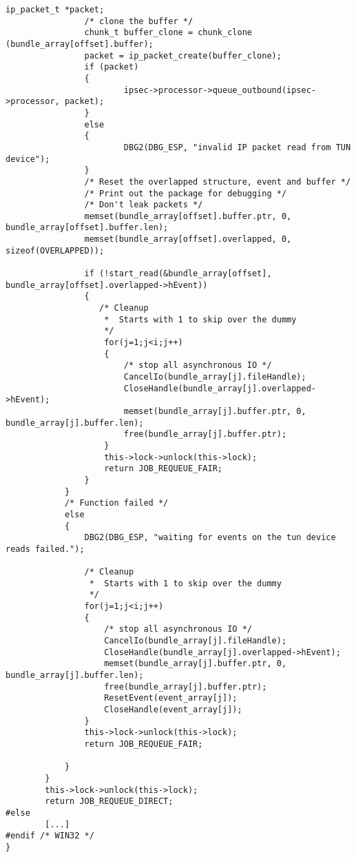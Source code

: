 \begin{lstlisting}[caption=Code für handle\_plain auf Windows,label=lst:handle-plain-windows]
                ip_packet_t *packet;
                /* clone the buffer */
                chunk_t buffer_clone = chunk_clone (bundle_array[offset].buffer);
                packet = ip_packet_create(buffer_clone);
                if (packet)
                {
                        ipsec->processor->queue_outbound(ipsec->processor, packet);
                }
                else
                {
                        DBG2(DBG_ESP, "invalid IP packet read from TUN device");
                }
                /* Reset the overlapped structure, event and buffer */
                /* Print out the package for debugging */
                /* Don't leak packets */
                memset(bundle_array[offset].buffer.ptr, 0, bundle_array[offset].buffer.len);
                memset(bundle_array[offset].overlapped, 0, sizeof(OVERLAPPED));

                if (!start_read(&bundle_array[offset], bundle_array[offset].overlapped->hEvent))
                {
                   /* Cleanup
                    *  Starts with 1 to skip over the dummy
                    */
                    for(j=1;j<i;j++)
                    {
                        /* stop all asynchronous IO */
                        CancelIo(bundle_array[j].fileHandle);
                        CloseHandle(bundle_array[j].overlapped->hEvent);
                        memset(bundle_array[j].buffer.ptr, 0, bundle_array[j].buffer.len);
                        free(bundle_array[j].buffer.ptr);
                    }
                    this->lock->unlock(this->lock);
                    return JOB_REQUEUE_FAIR;
                }
            }
            /* Function failed */
            else
            {
                DBG2(DBG_ESP, "waiting for events on the tun device reads failed.");

                /* Cleanup
                 *  Starts with 1 to skip over the dummy
                 */
                for(j=1;j<i;j++)
                {
                    /* stop all asynchronous IO */
                    CancelIo(bundle_array[j].fileHandle);
                    CloseHandle(bundle_array[j].overlapped->hEvent);
                    memset(bundle_array[j].buffer.ptr, 0, bundle_array[j].buffer.len);
                    free(bundle_array[j].buffer.ptr);
                    ResetEvent(event_array[j]);
                    CloseHandle(event_array[j]);
                }
                this->lock->unlock(this->lock);
                return JOB_REQUEUE_FAIR;

            }
        }
        this->lock->unlock(this->lock);
        return JOB_REQUEUE_DIRECT;
#else
        [...]
#endif /* WIN32 */
}
\end{lstlisting}

